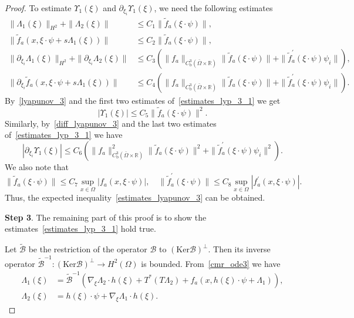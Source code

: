 \documentclass[10pt,a4paper]{amsart}
\begin{document}
\begin{proof}
To estimate $\Upsilon_1(\xi)$ and $\partial_{\xi_i}\Upsilon_1(\xi)$, we need the following estimates
\begin{equation}\label{estimates_lyp_3_1}
\begin{split}
	\| \Lambda_1(\xi)\|_{H^2} + \| \Lambda_2(\xi)\|&\leqslant C_1\|\tilde{f}_a(\xi\cdot\psi)\|,\\
	\|\tilde{f}_a(x, \xi\cdot\psi + s\Lambda_1(\xi))\|&\leqslant C_2 \|\tilde{f}_a(\xi\cdot\psi)\|,\\
	\|\partial_{\xi_i} \Lambda_1(\xi)\|_{H^2} + \| \partial_{\xi_i}\Lambda_2(\xi)\|&\leqslant C_3\left(\|f_a\|_{C^3_{\mathrm{b}}(\bar{\Omega}\times\mathbb{R})}\|\tilde{f}_a(\xi\cdot\psi)\| + \|\tilde{f}^{\prime}_a(\xi\cdot\psi)\psi_i \| \right), \\
	\|\partial_{\xi_i}\tilde{f}_a(x, \xi\cdot\psi + s\Lambda_1(\xi))\|&\leqslant C_4\left(\|f_a\|_{C^3_{\mathrm{b}}(\bar{\Omega}\times\mathbb{R})}\|\tilde{f}_a(\xi\cdot\psi)\| + \|\tilde{f}^{\prime}_a(\xi\cdot\psi)\psi_i \| \right).
\end{split}
\end{equation}
By~\eqref{lyapunov_3} and the first two estimates of~\eqref{estimates_lyp_3_1} we get
\[
|\Upsilon_1(\xi)| \leqslant C_5\|\tilde{f}_a(\xi\cdot\psi)\|^2.
\]
Similarly, by~\eqref{diff_lyapunov_3} and the last two estimates of~\eqref{estimates_lyp_3_1} we have
\[
|\partial_{\xi_i}\Upsilon_1(\xi)| \leqslant C_6\left(\|f_a\|^2_{C^3_{\mathrm{b}}(\bar{\Omega}\times\mathbb{R})}\|\tilde{f}_a(\xi\cdot\psi)\|^2 + \|\tilde{f}^{\prime}_a(\xi\cdot\psi)\psi_i \|^2 \right).
\]
We also note that
\begin{equation*}
	\|\tilde{f}_a(\xi\cdot\psi)\|\leqslant C_7\sup_{x\in\Omega}|f_a(x, \xi\cdot\psi)|,  \quad \|\tilde{f}^{\prime}_a(\xi\cdot\psi)\|\leqslant C_8 \sup_{x\in\Omega}|f^{\prime}_a(x, \xi\cdot\psi)|.
\end{equation*}
Thus, the expected inequality~\eqref{estimates_lyapunov_3} can be obtained.

\textbf{Step 3}. The remaining part of this proof is to show the estimates~\eqref{estimates_lyp_3_1} hold true. 

Let $\tilde{\mathcal{B}}$ be the restriction of the operator $\mathcal{B}$ to $(\mathrm{Ker}\mathcal{B})^{\bot}$. Then its inverse operator $\tilde{\mathcal{B}}^{-1}: (\mathrm{Ker}\mathcal{B})^{\bot}\rightarrow H^2(\Omega)$ is bounded. From~\eqref{cmr_ode3} we have
\begin{equation} \label{eq:lambdas}
\begin{split}
	\Lambda_1(\xi) &= \tilde{\mathcal{B}}^{-1}\left(\nabla_{\xi}\Lambda_2 \cdot h(\xi) + T^\ast(T\Lambda_2) + f_a(x, h(\xi)\cdot \psi + \Lambda_1)\right),\\
	\Lambda_2(\xi) &= h(\xi)\cdot \psi + \nabla_{\xi}\Lambda_1 \cdot h(\xi).
\end{split}
\end{equation}


\end{proof}
\end{document}
